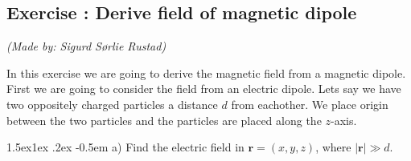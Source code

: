 \documentclass[%
oneside,                 %
final,                   %
10pt]{article}
\makeatletter
\newenvironment{doconceexercise}{}{}
\newcounter{doconceexercisecounter}
\newcommand\subex{\@startsection{paragraph}{4}{\z@}%
                  {1.5ex\@plus1ex \@minus.2ex}%
                  {-0.5em}%
                  {\normalfont\normalsize\bfseries}}
\makeatother
\begin{document}

\newcommand{\exercisesection}[1]{\subsection*{#1}}





\begin{doconceexercise}

\exercisesection{Exercise \thedoconceexercisecounter: Derive field of magnetic dipole}


\emph{(Made by: Sigurd Sørlie Rustad)}

\noindent
In this exercise we are going to derive the magnetic field from a magnetic dipole. First we are going  to consider the field from an electric dipole. Lets say we have two oppositely charged particles a distance $d$ from eachother. We place origin between the two particles and the particles are placed along the $z$-axis.


\subex{a)}
Find the electric field in $\mathbf{r} = (x, y, z)$, where $|\mathbf{r}|\gg d$.



\end{doconceexercise}
\end{document}
